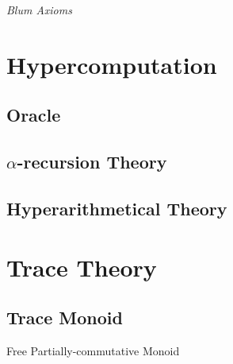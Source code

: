 \emph{Blum Axioms}



\section{Hypercomputation}\label{sec:hypercomputation}

\subsection{Oracle}\label{sec:oracle}

\subsection{$\alpha$-recursion Theory}\label{sec:alpha_recursion}

\subsection{Hyperarithmetical Theory}\label{sec:hyperarithmetical_theory}



\section{Trace Theory}\label{sec:trace_theory}

\subsection{Trace Monoid}\label{sec:trace_monoid}

Free Partially-commutative Monoid

